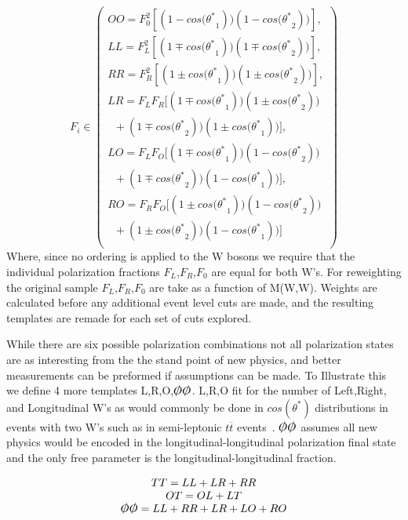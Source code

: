 \documentclass[10pt,twocolumn]{article}
\def\ts{\ensuremath{ \theta^{*} }\xspace}
\def\cts{\ensuremath{ cos(\ts) }\xspace}
\def\ctsnb{\ensuremath{ cos(\ts }\xspace}
\begin{document}
\small
\begin{equation}
F_i \in  \left( \begin{array}{c} 
  OO=F_0^2 [(1 - \ctsnb_1))(1 - \ctsnb_2))],\\
  LL=F_L^2 [(1 \mp \ctsnb_1))(1 \mp \ctsnb_2))],\\
  RR=F_R^2 [(1 \pm \ctsnb_1))(1 \pm \ctsnb_2))],\\
  LR=F_L F_R[ (1 \mp \ctsnb_1))(1 \pm \ctsnb_2))\\ \;\;+(1 \mp \ctsnb_2))(1 \pm \ctsnb_1))],\\
  LO=F_L F_O[ (1 \mp \ctsnb_1))(1 - \ctsnb_2))\\  \;\;+(1 \mp \ctsnb_2))(1 - \ctsnb_1)) ],\\
  RO =F_R F_O[ (1 \pm \ctsnb_1))(1 - \ctsnb_2))\\  \;\;+(1 \pm \ctsnb_2))(1 - \ctsnb_1)) ]\\
\end{array} \right)
\end{equation}
\normalsize
Where, since no ordering is applied to the W bosons we  require that the individual polarization fractions $F_L$,$F_R$,$F_0$ are equal for both W's. For reweighting the original sample $F_L$,$F_R$,$F_0$  are take as a function of M(W,W). Weights are calculated before any additional event level cuts are made, and the resulting templates are remade for each set of cuts explored.
 
While there are six possible polarization combinations not all polarization states are as interesting from the the stand point of new physics, and better measurements can be preformed if assumptions can be made. To Illustrate this we define 4 more templates L,R,O,$\slashed{O}\slashed{O}$. L,R,O fit for the number of Left,Right, and Longitudinal W's as would commonly be done in \cts distributions in events with two W's such as in semi-leptonic $t \overline{t}$ events~\cite{}. $\slashed{O}\slashed{O}$ assumes all new physics would be encoded in the longitudinal-longitudinal polarization final state and the only free parameter is the longitudinal-longitudinal fraction.

\small
\begin{equation}
\begin{array}{c}
TT=LL+LR+RR\\
OT=OL+LT\\
\slashed{O}\slashed{O}=LL+RR+LR+LO+RO\\
\end{array}
\end{equation}
\normalsize
\end{document}
